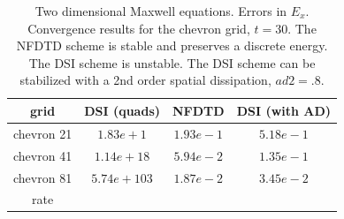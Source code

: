 \documentclass[10pt]{article}
\begin{document}
\begin{table}[hbt]
\begin{center}
\begin{tabular}{|c|c|c|c|} \hline 
  grid              &   DSI (quads)& NFDTD       &   DSI (with AD)  \\   \hline\hline 
  chevron 21        & $1.83e+1$   & $1.93e-1$  & $5.18e-1 $     \\ 
  chevron 41        & $1.14e+18$   & $5.94e-2$  & $1.35e-1 $     \\ 
  chevron 81        & $5.74e+103$  & $1.87e-2$  & $3.45e-2 $    \\ 
   rate             &              &             &                \\ \hline
\end{tabular}
\end{center}
\caption{Two dimensional Maxwell equations. Errors in $E_x$. Convergence results for the chevron grid, $t=30.$
       The NFDTD scheme is stable and preserves a discrete energy. The DSI scheme is unstable. The DSI scheme
   can be stabilized with a 2nd order spatial dissipation, $ad2=.8$.}
 \label{tab:conv chevron} 
\end{table}
\end{document}
